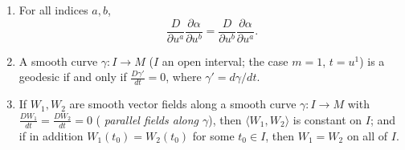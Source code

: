 \begin{lemma}
\begin{enumerate}
$$=\left\langle\frac{DW_1}{\partial u^a},W_2\right\rangle
+\left\langle W_1,\frac{DW_2}{\partial u^a}\right\rangle .$$
\item For all indices $a,b$,
$$\frac{D}{\partial u^a}\frac{\partial\alpha}{\partial u^b}
=\frac{D}{\partial u^b}\frac{\partial\alpha}{\partial u^a}.$$
\item A smooth curve $\gamma\colon I\to M$ ($I$ an open interval; the
case $m=1$, $t=u^1$) is a geodesic if and only if
$\frac{D\gamma'}{dt}=0$, where $\gamma'=d\gamma/dt$.
\item If $W_1,W_2$ are smooth vector fields along a smooth curve
$\gamma\colon I\to M$ with $\frac{DW_1}{dt}=\frac{DW_2}{dt}=0$ ({\em
parallel fields along $\gamma$}), then $\langle W_1,W_2\rangle$ is
constant on $I$; and if in addition $W_1(t_0)=W_2(t_0)$ for some
$t_0\in I$, then $W_1=W_2$ on all of $I$.
\end{enumerate}
\end{lemma}

